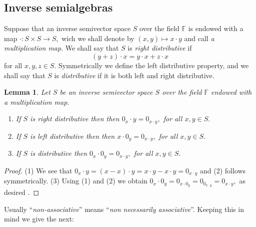 \documentclass[10pt,a4paper]{amsart}
\newtheorem{lem}[thm]{Lemma}
\theoremstyle{definition}
\theoremstyle{remark}
\numberwithin{equation}{section}
\newtheorem*{Theorem A}{\textbf{Theorem A}}
\newtheorem*{Corollary E}{\textbf{Corollary E}}
\newtheorem*{Corollary F}{\textbf{Corollary F}}
\newtheorem*{Theorem B}{\textbf{Theorem B}}
\newtheorem*{Theorem C}{\textbf{Theorem C}}
\newtheorem*{Theorem D}{\textbf{Theorem B}}
\newtheorem*{p a}{\textbf{Proof of  Theorem A}}
\newtheorem*{p b}{\textbf{Proof of Theorem B}}
\newtheorem*{p c}{\textbf{Proof of  Theorem C}}
\newtheorem*{p d}{\textbf{Proof of  Theorem D}}
\newcommand{\0}{{\vartheta}}
\begin{document}
\subsection{Inverse semialgebras}

Suppose that  an inverse semivector space $S$ over  the field $\mathbb{F}$ is endowed with a map $\cdot:S \times S \rightarrow S,$ wich we shall denote by $(x,y)\mapsto x\cdot y$ and call {\it a multiplication map}. We shall say that $S$   is {\em right distributive} if 
\begin{equation}\label{RightDistr}
     (y+z)\cdot x=y\cdot x+z\cdot x 
\end{equation} 
 for all  $x,y,z\in S.$ Symmetrically we define the left distributive property, and we shall say that $S$   is {\em distributive} if it is both left and right distributive.

\begin{lem}\label{lemma_distributive} Let $S$ be an inverse semivector space $S$ over  the field $\mathbb{F}$  endowed with a  multiplication map.
\begin{enumerate} 
\item If $S$ is  right distributive then then $0_x \cdot y=0_{x\cdot y},$ for all $x,y\in S.$ 
\item If $S$ is  left distributive then then $x \cdot 0_y=0_{x\cdot y},$ for all $x,y\in S.$ 
\item If $S$ is  distributive  then $0_x \cdot 0_y=0_{x\cdot y},$ for all $x,y\in S.$ 
 \end{enumerate}
\end{lem}
\begin{proof}
(1) We see that $0_x\cdot y=(x-x)\cdot y=x\cdot y-x\cdot y=0_{x\cdot y}$ and (2) follows symmetrically.
(3) Using (1) and (2) we obtain $0_x \cdot 0_y = 0_{x \cdot 0_y}= 0_{0_{x\cdot y}}   =  0_{x \cdot y},$ as desired{\color{red} .}
\end{proof}


  Usually  ``{\em non-associative}'' means ``{\em non necessarily associative}''. Keeping this in mind we give the next:
\end{document}
